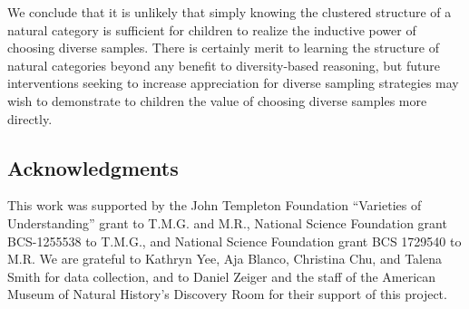 \documentclass[10pt,letterpaper]{article}
\begin{document}
We conclude that it is unlikely that simply knowing the clustered structure of a natural category is sufficient for children to realize the inductive power of choosing diverse samples.
There is certainly merit to learning the structure of natural categories beyond any benefit to diversity-based reasoning, but
future interventions seeking to increase appreciation for diverse sampling strategies may wish to demonstrate to children the value of choosing diverse samples more directly.


\subsection{Acknowledgments}

This work was supported by the John Templeton Foundation ``Varieties of Understanding'' grant to T.M.G. and M.R., National Science Foundation grant BCS-1255538 to T.M.G., and National Science Foundation grant BCS 1729540 to M.R.
We are grateful to Kathryn Yee, Aja Blanco, Christina Chu, and Talena Smith for data collection, and to Daniel Zeiger and the staff of the American Museum of Natural History's Discovery Room for their support of this project.




\setlength{\bibleftmargin}{.125in}
\setlength{\bibindent}{-\bibleftmargin}
\vspace{-0.1cm}

\end{document}
